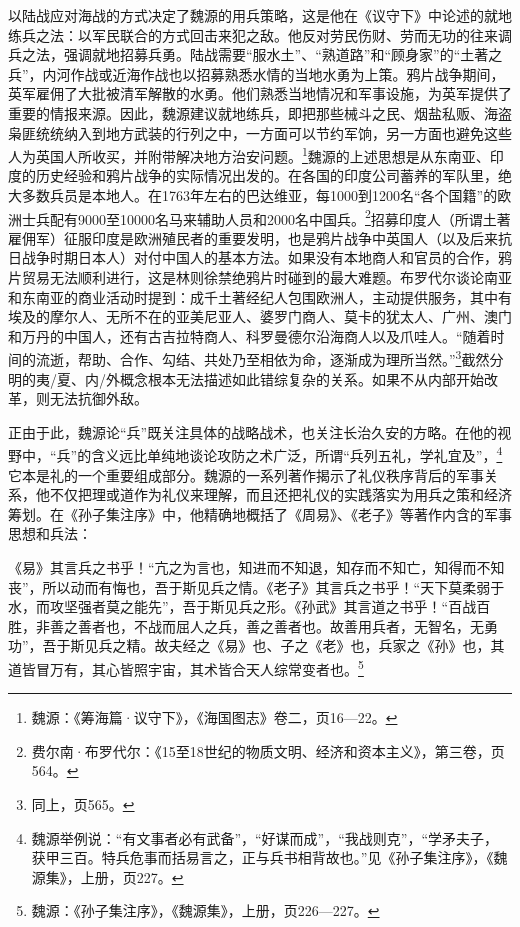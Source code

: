 \documentclass[a4paper, 12pt, openright]{ctexbook}
\renewenvironment{quote}
  {\list{}{\rightmargin2\ccwd \leftmargin2\ccwd \itemindent=2\ccwd \listparindent=2\ccwd}%
   \item\relax\small\kaishu\color{black}}
  {\endlist}
\begin{document}
以陆战应对海战的方式决定了魏源的用兵策略，这是他在《议守下》中论述的就地练兵之法：以军民联合的方式回击来犯之敌。他反对劳民伤财、劳而无功的往来调兵之法，强调就地招募兵勇。陆战需要“服水土”、“熟道路”和“顾身家”的“土著之兵”，内河作战或近海作战也以招募熟悉水情的当地水勇为上策。鸦片战争期间，英军雇佣了大批被清军解散的水勇。他们熟悉当地情况和军事设施，为英军提供了重要的情报来源。因此，魏源建议就地练兵，即把那些械斗之民、烟盐私贩、海盗枭匪统统纳入到地方武装的行列之中，一方面可以节约军饷，另一方面也避免这些人为英国人所收买，并附带解决地方治安问题。\footnote{魏源：《筹海篇·议守下》，《海国图志》卷二，页16—22。}魏源的上述思想是从东南亚、印度的历史经验和鸦片战争的实际情况出发的。在各国的印度公司蓄养的军队里，绝大多数兵员是本地人。在1763年左右的巴达维亚，每1000到1200名“各个国籍”的欧洲士兵配有9000至10000名马来辅助人员和2000名中国兵。\footnote{费尔南·布罗代尔：《15至18世纪的物质文明、经济和资本主义》，第三卷，页564。}招募印度人（所谓土著雇佣军）征服印度是欧洲殖民者的重要发明，也是鸦片战争中英国人（以及后来抗日战争时期日本人）对付中国人的基本方法。如果没有本地商人和官员的合作，鸦片贸易无法顺利进行，这是林则徐禁绝鸦片时碰到的最大难题。布罗代尔谈论南亚和东南亚的商业活动时提到：成千土著经纪人包围欧洲人，主动提供服务，其中有埃及的摩尔人、无所不在的亚美尼亚人、婆罗门商人、莫卡的犹太人、广州、澳门和万丹的中国人，还有古吉拉特商人、科罗曼德尔沿海商人以及爪哇人。“随着时间的流逝，帮助、合作、勾结、共处乃至相依为命，逐渐成为理所当然。”\footnote{同上，页565。}截然分明的夷/夏、内/外概念根本无法描述如此错综复杂的关系。如果不从内部开始改革，则无法抗御外敌。

正由于此，魏源论“兵”既关注具体的战略战术，也关注长治久安的方略。在他的视野中，“兵”的含义远比单纯地谈论攻防之术广泛，所谓“兵列五礼，学礼宜及”，\footnote{魏源举例说：“有文事者必有武备”，“好谋而成”，“我战则克”，“学矛夫子，获甲三百。特兵危事而括易言之，正与兵书相背故也。”见《孙子集注序》，《魏源集》，上册，页227。}它本是礼的一个重要组成部分。魏源的一系列著作揭示了礼仪秩序背后的军事关系，他不仅把理或道作为礼仪来理解，而且还把礼仪的实践落实为用兵之策和经济筹划。在《孙子集注序》中，他精确地概括了《周易》、《老子》等著作内含的军事思想和兵法：

\begin{quote}
《易》其言兵之书乎！“亢之为言也，知进而不知退，知存而不知亡，知得而不知丧”，所以动而有悔也，吾于斯见兵之情。《老子》其言兵之书乎！“天下莫柔弱于水，而攻坚强者莫之能先”，吾于斯见兵之形。《孙武》其言道之书乎！“百战百胜，非善之善者也，不战而屈人之兵，善之善者也。故善用兵者，无智名，无勇功”，吾于斯见兵之精。故夫经之《易》也、子之《老》也，兵家之《孙》也，其道皆冒万有，其心皆照宇宙，其术皆合天人综常变者也。\footnote{魏源：《孙子集注序》，《魏源集》，上册，页226—227。}
\end{quote}
\end{document}
